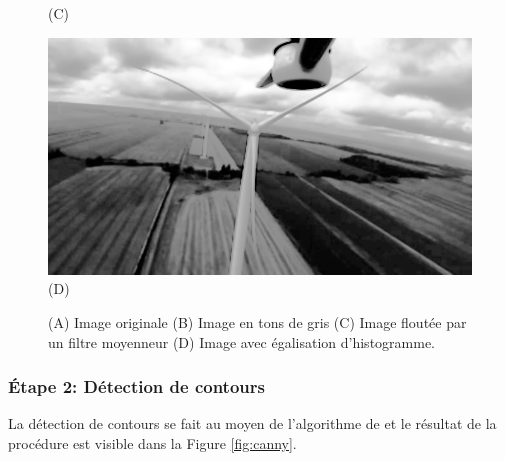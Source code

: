 \begin{figure}[htp]
\begin{minipage}{0.49\textwidth}
  (C)
\end{minipage}
\begin{minipage}{0.49\textwidth}
  \centering
  \includegraphics[width=\linewidth]{images/preprocess_histogram.png}
  (D)
\end{minipage}
\caption[Prétraitement d'image pour la détection de lignes.]{(A) Image originale (B) Image en tons de gris (C) Image floutée par un filtre moyenneur (D) Image avec égalisation d'histogramme.}
\label{fig:detection_pretraitement}
\end{figure}

\subsubsection{Étape 2: Détection de contours}
La détection de contours se fait au moyen de l'algorithme de \citep{Canny1986} et le résultat de la procédure est visible dans la Figure \ref{fig:canny}.

